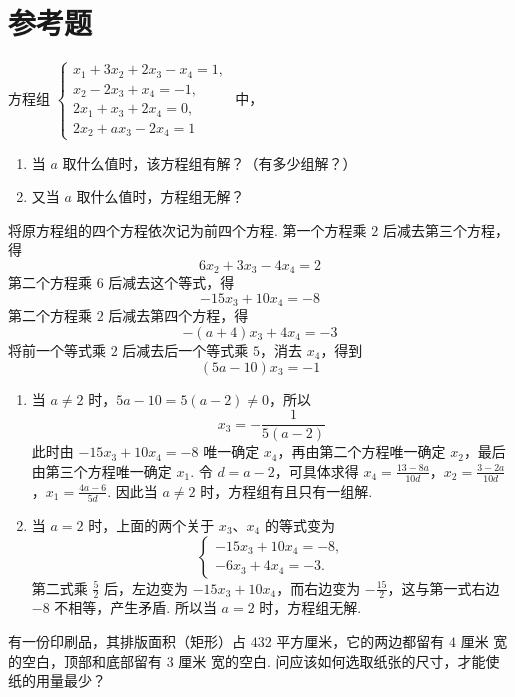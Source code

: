\section{参考题}

\begin{problem}
方程组 \(\begin{cases}
x_1+3x_2+2x_3-x_4=1,\\
x_2-2x_3+x_4=-1,\\
2x_1+x_3+2x_4=0,\\
2x_2+ax_3-2x_4=1
\end{cases}\)
中，
\begin{enumerate}
\item 当 \(a\) 取什么值时，该方程组有解？（有多少组解？）
\item 又当 \(a\) 取什么值时，方程组无解？
\end{enumerate}
\end{problem}

\begin{solution}
将原方程组的四个方程依次记为前四个方程. 第一个方程乘 \(2\) 后减去第三个方程，得
\[
6x_2+3x_3-4x_4=2
\]
第二个方程乘 \(6\) 后减去这个等式，得
\[
-15x_3+10x_4=-8
\]
第二个方程乘 \(2\) 后减去第四个方程，得
\[
-\left(a+4\right)x_3+4x_4=-3
\]
将前一个等式乘 \(2\) 后减去后一个等式乘 \(5\)，消去 \(x_4\)，得到
\[
\left(5a-10\right)x_3=-1
\]

\begin{enumerate}
\item 当 \(a\ne2\) 时，\(5a-10=5\left(a-2\right)\ne0\)，所以
\[
x_3=-\frac{1}{5\left(a-2\right)}
\]
此时由 \(-15x_3+10x_4=-8\) 唯一确定 \(x_4\)，再由第二个方程唯一确定 \(x_2\)，最后由第三个方程唯一确定 \(x_1\). 令 \(d=a-2\)，可具体求得
\(x_4=\frac{13-8a}{10d}\)，\(x_2=\frac{3-2a}{10d}\)，\(x_1=\frac{4a-6}{5d}\).
因此当 \(a\ne2\) 时，方程组有且只有一组解.

\item 当 \(a=2\) 时，上面的两个关于 \(x_3\)、\(x_4\) 的等式变为
\[
\begin{cases}
-15x_3+10x_4=-8,\\
-6x_3+4x_4=-3.
\end{cases}
\]
第二式乘 \(\frac{5}{2}\) 后，左边变为 \(-15x_3+10x_4\)，而右边变为 \(-\frac{15}{2}\)，这与第一式右边 \(-8\) 不相等，产生矛盾. 所以当 \(a=2\) 时，方程组无解.
\end{enumerate}
\end{solution}

\begin{problem}
有一份印刷品，其排版面积（矩形）占 \(432\text{ 平方厘米}\)，它的两边都留有 \(4\text{ 厘米}\) 宽的空白，顶部和底部留有 \(3\text{ 厘米}\) 宽的空白. 问应该如何选取纸张的尺寸，才能使纸的用量最少？
\end{problem}

